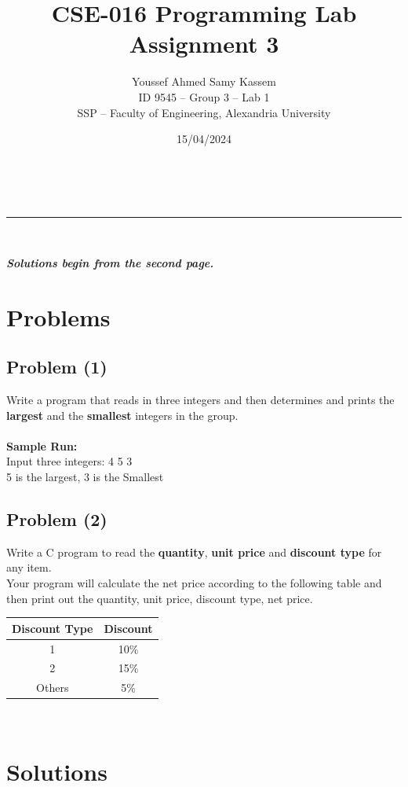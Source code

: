 \documentclass[a4paper,11pt]{article}
\makeatletter
\renewcommand\tableofcontents{%
    \section*{\makebox[\linewidth][c]{\contentsname}%
      \@mkboth{\MakeUppercase\contentsname}{\MakeUppercase\contentsname}}%
    \begin{multicols}{2}%
    \@starttoc{toc}%
    \end{multicols}
    }
\newcommand{\linia}{\rule{\linewidth}{0.5pt}}
\theoremstyle{mytheor}
\theoremstyle{mytheor}
\renewcommand{\maketitle}{
\begin{center}
\vspace{2ex}
{\huge \textsf{\textbf{\@title}}}
\vspace{1ex}
\\
\linia\\
\textsf{\@date \hfill
\@author}
\vspace{4ex}
\end{center}
}
\makeatother
\begin{document}
\title{CSE-016 Programming Lab Assignment \textnumero{} 3}

\date{15/04/2024}

\author{Youssef Ahmed Samy Kassem\\ \hfill ID 9545 -- Group 3 -- Lab 1\\ \hfill SSP -- Faculty of Engineering, Alexandria University\\}

\maketitle
\textsf{\textsl{\textbf{Solutions begin from the second page.}}}
\section{Problems}
\subsection{Problem (1)}
Write a program that reads in three integers and then determines and prints the \textbf{largest} and the \textbf{smallest} integers in the group.\\\\
\textbf{Sample Run:}\\
Input three integers: 4 5 3\\
5 is the largest, 3 is the Smallest
\subsection{Problem (2)}
Write a C program to read the \textbf{quantity}, \textbf{unit price} and \textbf{discount type} for any item.\\
Your program will calculate the net price according to the following table and then
print out the quantity, unit price, discount type, net price.\\
\setlength{\tabcolsep}{18pt}
\begin{center}
\begin{tabular}{ |c|c| }
\hline
\textbf{Discount Type} & \textbf{Discount} \\
\hline
1 & 10\%  \\  
\hline
2 & 15\% \\
\hline
Others & 5\% \\
\hline
\end{tabular}
\end{center}
\ \\
\tableofcontents
\newpage
\section{Solutions}
\end{document}
